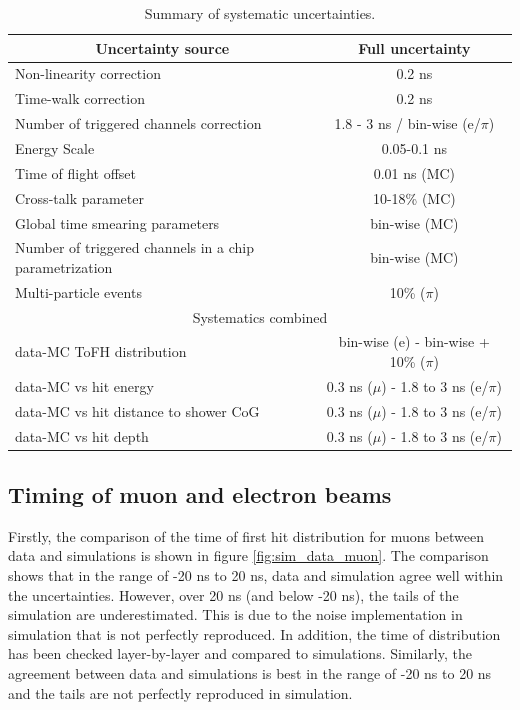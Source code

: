 \documentclass{JINST}
\begin{document}
\begin{table}[htb!]
	\centering
	\caption{Summary of systematic uncertainties.}
	\label{table:time_syst}
	\begin{tabular}{@{} lc @{}}
		\toprule
		\multicolumn{1}{c}{Uncertainty source} & Full uncertainty \\
		\midrule
		Non-linearity correction & 0.2 ns \\
		Time-walk correction & 0.2 ns \\
		Number of triggered channels correction & 1.8 - 3 ns / bin-wise (e/$\pi$)\\
		Energy Scale & 0.05-0.1 ns \\
		Time of flight offset & 0.01 ns (MC) \\
		Cross-talk parameter & 10-18\% (MC)\\
		Global time smearing parameters & bin-wise (MC)\\
		Number of triggered channels in a chip parametrization & bin-wise (MC)\\
		Multi-particle events & 10\% ($\pi$) \\
		\midrule
		\midrule
		\multicolumn{2}{c}{Systematics combined} \\
		\midrule
		data-MC ToFH distribution & bin-wise (e) - bin-wise + 10\% ($\pi$) \\
		data-MC vs hit energy & 0.3 ns ($\mu$) - 1.8 to 3 ns (e/$\pi$)\\
		data-MC vs hit distance to shower CoG & 0.3 ns ($\mu$) - 1.8 to 3 ns (e/$\pi$)\\
		data-MC vs hit depth & 0.3 ns ($\mu$) - 1.8 to 3 ns (e/$\pi$)\\
		\bottomrule
	\end{tabular}
\end{table}

\subsection{Timing of muon and electron beams}

Firstly, the comparison of the time of first hit distribution for muons between data and simulations is shown in figure \ref{fig:sim_data_muon}. The comparison shows that in the range of -20 ns to 20 ns, data and simulation agree well within the uncertainties. However, over 20 ns (and below -20 ns), the tails of the simulation are underestimated. This is due to the noise implementation in simulation that is not perfectly reproduced. In addition, the time of distribution has been checked layer-by-layer and compared to simulations. Similarly, the agreement between data and simulations is best in the range of -20 ns to 20 ns and the tails are not perfectly reproduced in simulation.
\end{document}
